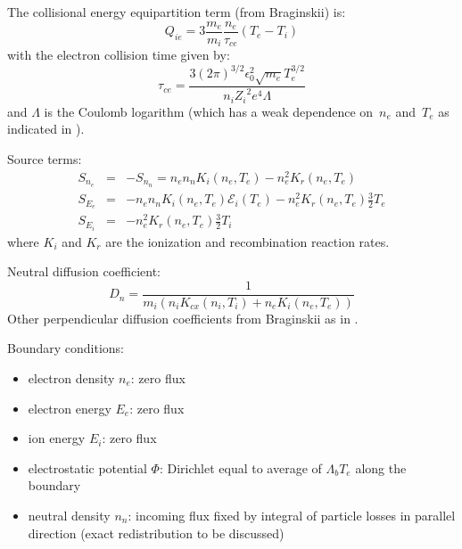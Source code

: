 The collisional energy equipartition term (from Braginskii) is:
\begin{equation}
Q_{ie} = 3 {\frac{m_e}{m_i}} \frac{n_e}{\tau_{ce}} \left( T_e - T_i \right)
\end{equation}
with the electron collision time given by: 
\begin{equation}
\tau_{ce} = \frac{3 \left(2 
\pi \right)^{3/2} \epsilon_0^2 \sqrt{m_e} T_e^{3/2}}{n_i 
{Z_i}^2 e^4 \Lambda}
\end{equation}
and $\Lambda$ is the Coulomb 
logarithm (which has a weak dependence on~$n_e$ and~$T_e$ as indicated in ).

Source terms:
\begin{eqnarray}
S_{n_e} & = & -S_{n_n} = n_e n_n K_i \left( n_e, T_e \right) - n_e^2 
K_r \left( n_e, T_e \right) \\
S_{E_e} & = &  - n_e n_n K_i \left( n_e, T_e \right) \mathcal{E}_i 
\left( T_e \right) - n_e^2 K_r \left( n_e, T_e \right) \frac{3}{2} T_e 
\\
S_{E_i} & = &  - n_e^2 K_r \left( n_e, T_e \right) \frac{3}{2} T_i
\end{eqnarray}
where $K_i$ and $K_r$ are the ionization and recombination reaction rates.

Neutral diffusion coefficient:
\begin{equation}
D_n = \frac{1}{m_i \left( n_i K_{cx} ( n_i, T_i ) + n_e K_i ( n_e, T_e ) \right)}
\end{equation}
Other perpendicular diffusion coefficients from Braginskii as
in .

Boundary conditions:
\begin{itemize}
\item electron density $n_e$: zero flux
\item electron energy $E_e$: zero flux
\item ion energy $E_i$: zero flux
\item electrostatic potential $\Phi$: Dirichlet equal to 
average of $\Lambda_b T_e$ along the boundary
\item neutral density $n_n$: incoming flux fixed by integral of 
particle losses in parallel direction (exact redistribution to be 
discussed)
\end{itemize}

